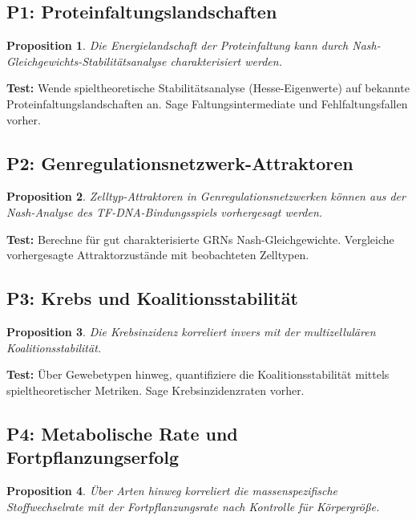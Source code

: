 \documentclass[12pt,a4paper]{article}
\newtheorem{proposition}{Proposition}
\theoremstyle{remark}
\begin{document}
\subsection{P1: Proteinfaltungslandschaften}

\begin{proposition}
Die Energielandschaft der Proteinfaltung kann durch Nash-Gleichgewichts-Stabilit\"atsanalyse charakterisiert werden.
\end{proposition}

\textbf{Test:} Wende spieltheoretische Stabilit\"atsanalyse (Hesse-Eigenwerte) auf bekannte Proteinfaltungslandschaften an. Sage Faltungsintermediate und Fehlfaltungsfallen vorher.

\subsection{P2: Genregulationsnetzwerk-Attraktoren}

\begin{proposition}
Zelltyp-Attraktoren in Genregulationsnetzwerken k\"onnen aus der Nash-Analyse des TF-DNA-Bindungsspiels vorhergesagt werden.
\end{proposition}

\textbf{Test:} Berechne f\"ur gut charakterisierte GRNs Nash-Gleichgewichte. Vergleiche vorhergesagte Attraktorzust\"ande mit beobachteten Zelltypen.

\subsection{P3: Krebs und Koalitionsstabilit\"at}

\begin{proposition}
Die Krebsinzidenz korreliert invers mit der multizellul\"aren Koalitionsstabilit\"at.
\end{proposition}

\textbf{Test:} \"Uber Gewebetypen hinweg, quantifiziere die Koalitionsstabilit\"at mittels spieltheoretischer Metriken. Sage Krebsinzidenzraten vorher.

\subsection{P4: Metabolische Rate und Fortpflanzungserfolg}

\begin{proposition}
\"Uber Arten hinweg korreliert die massenspezifische Stoffwechselrate mit der Fortpflanzungsrate nach Kontrolle f\"ur K\"orpergr\"o\ss{}e.
\end{proposition}
\end{document}
